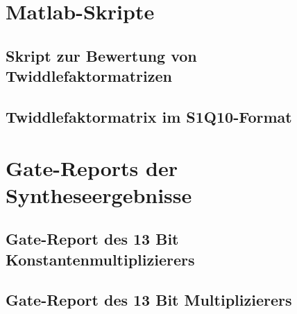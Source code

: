  \chapter{Matlab-Skripte}
 \section{Skript zur Bewertung von Twiddlefaktormatrizen}
 
 

 \section{Twiddlefaktormatrix im S1Q10-Format}
 
 
 
 
 
 
 
 \chapter{Gate-Reports der Syntheseergebnisse}
\section{Gate-Report des 13 Bit Konstantenmultiplizierers}
 
\section{Gate-Report des 13 Bit Multiplizierers}
  
